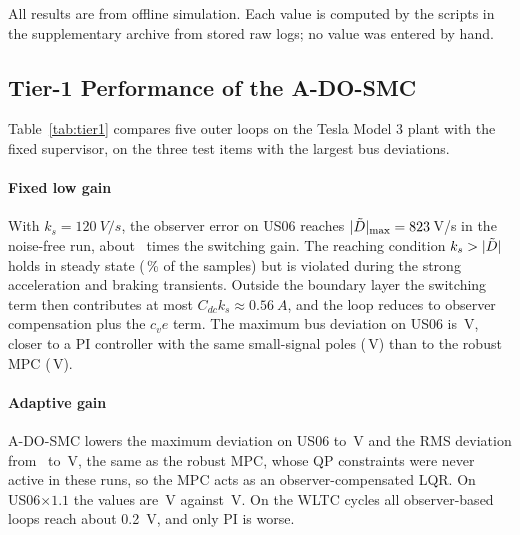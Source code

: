 All results are from offline simulation. Each value is computed by the scripts in the supplementary archive from stored raw logs; no value was entered by hand.

\subsection{Tier-1 Performance of the A-DO-SMC}\label{sec:res_tier1}


Table~\ref{tab:tier1} compares five outer loops on the Tesla Model 3 plant with the fixed supervisor, on the three test items with the largest bus deviations.

\paragraph{Fixed low gain}
With $k_s=\SI{120}{V/s}$, the observer error on US06 reaches $|\tilde{D}|_{\max}=823$\,V/s in the noise-free run, about \DtLoRatio\ times the switching gain. The reaching condition $k_s>|\tilde{D}|$ holds in steady state (\CondLoFrac\,\% of the samples) but is violated during the strong acceleration and braking transients. Outside the boundary layer the switching term then contributes at most $C_{dc}k_s\approx\SI{0.56}{A}$, and the loop reduces to observer compensation plus the $c_ve$ term. The maximum bus deviation on US06 is \TOneLoUSMax\,V, closer to a PI controller with the same small-signal poles (\TOnePIUSMax\,V) than to the robust MPC (\TOneMPCUSMax\,V).

\paragraph{Adaptive gain}
A-DO-SMC lowers the maximum deviation on US06 to \TOneAUSMax\,V and the RMS deviation from \TOneLoUSRms\ to \TOneAUSRms\,V, the same as the robust MPC, whose QP constraints were never active in these runs, so the MPC acts as an observer-compensated LQR. On US06$\times1.1$ the values are \TOneAUSbMax\,V against \TOneLoUSbMax\,V. On the WLTC cycles all observer-based loops reach about \SI{0.2}{V}, and only PI is worse.

